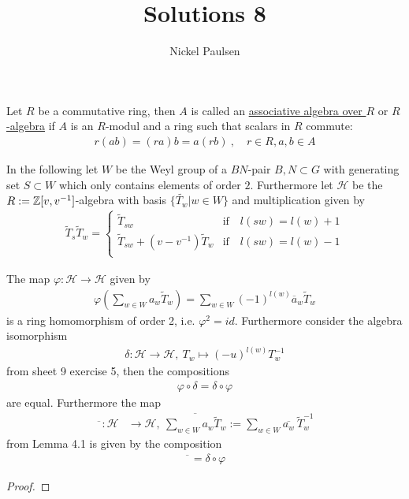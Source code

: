 \documentclass[]{article}
\title{Solutions 8}
\author{Nickel Paulsen}
\begin{document}
\maketitle



\begin{definition*}
   Let \(R\) be a commutative ring, then \(A\) is called an \underline{associative algebra over \(R\)} or \underline{\(R\)-algebra} if \(A\) is an \(R\)-modul and a ring 
   such that scalars in \(R\) commute:
   \begin{align*}
     r ( a b) = (r a) b = a(rb) \ , \quad r \in R, a,b \in A
   \end{align*}
\end{definition*}

In the following let \(W\) be the Weyl group of a \(BN\)-pair \(B,N \subset G\) with generating set \(S \subset W\) which only contains elements
of order \(2\). Furthermore let \(\mathscr{H}\) be the \(R:={\mathbb{Z}}[v,v^{-1}]\)-algebra with basis \(\{\widetilde{T_w} | w \in W\}\) and multiplication given by
\begin{align*}
    \widetilde{T}_{s} \widetilde{T}_w =
    \begin{cases}
        \widetilde{T}_{s w}& \text{if} \quad l(s w) = l(w) +1 \\
        \widetilde{T}_{s w}+(v-v^{-1})\widetilde{T}_w & \text{if} \quad l(s w)= l(w)-1 \\
    \end{cases}
\end{align*}

\begin{exercise}
    The map \(\varphi : \mathscr{H} \rightarrow \mathscr{H}\) given by
    \begin{align*}
        \varphi\left(\sum_{w \in W}^{}a_w \widetilde{T}_w\right) = \sum_{w \in W}^{}(-1)^{l(w)}\overline{a}_w\widetilde{T}_w
    \end{align*}
    is a ring homomorphism of order 2, i.e. \(\varphi^2 = id\). Furthermore consider the algebra isomorphism
    \begin{align*}
        \delta: \mathscr{H} \rightarrow \mathscr{H}, \ T_w \mapsto (-u)^{l(w)} T_w^{-1}
    \end{align*}
    from sheet 9 exercise 5, then the compositions 
    \begin{align*}
        \varphi \circ \delta = \delta \circ \varphi
    \end{align*}
    are equal. Furthermore the map 
    \begin{align*}
        \overline{\phantom{x}}:\mathscr{H} &\rightarrow \mathscr{H}, \ \overline{\sum_{w \in W}^{}a_w \widetilde{T}_w} := \sum_{w \in W}^{} \overline{a_w} \ \widetilde{T}_w^{-1} 
    \end{align*}
    from Lemma 4.1 is given by the composition
    \begin{align*}
        \overline{\phantom{x}} = \delta \circ \varphi
    \end{align*}
\end{exercise}

\begin{proof}
\end{proof}
\end{document}
